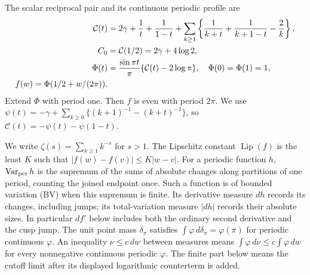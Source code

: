 The scalar reciprocal pair and its continuous periodic profile are
\begin{align}\label{uc:scalar-definitions}
 \mathcal C(t)&=2\gamma+\frac1t+\frac1{1-t}
 +\sum_{k\geq1}\left\{\frac1{k+t}+\frac1{k+1-t}-\frac2k\right\},
 \notag\\
 C_0&=\mathcal C(1/2)=2\gamma+4\log2,\notag\\
 \Phi(t)&=\frac{\sin\pi t}{\pi}\{\mathcal C(t)-2\log\pi\},
 \quad\Phi(0)=\Phi(1)=1,\notag\\
 f(w)=\Phi(1/2+w/(2\pi)).
\end{align}
Extend $\Phi$ with period one. Then $f$ is even with period $2\pi$.
We use $\psi(t)=-\gamma+\sum_{k\geq0}\{(k+1)^{-1}-(k+t)^{-1}\}$,
so $\mathcal C(t)=-\psi(t)-\psi(1-t)$.

We write $\zeta(s)=\sum_{k\geq1}k^{-s}$ for $s>1$.
The Lipschitz constant $\operatorname{Lip}(f)$ is the least $K$ such
that $|f(w)-f(v)|\leq K|w-v|$.
For a periodic function $h$, $\operatorname{Var}_{\rm per}h$ is the
supremum of the sums of absolute changes along partitions of one
period, counting the joined endpoint once. Such a function is of
bounded variation (BV) when this supremum is finite. Its derivative
measure $dh$ records its changes, including jumps; its
total-variation measure $|dh|$ records their absolute sizes.
In particular $df'$ below includes both the ordinary second derivative
and the cusp jump. The unit point mass $\delta_\pi$ satisfies
$\int\varphi\,d\delta_\pi=\varphi(\pi)$ for periodic continuous
$\varphi$. An inequality $\nu\leq c\,dw$ between measures means
$\int\varphi\,d\nu\leq c\int\varphi\,dw$ for every nonnegative
continuous periodic $\varphi$.
The finite part below means the cutoff limit after its
displayed logarithmic counterterm is added.

